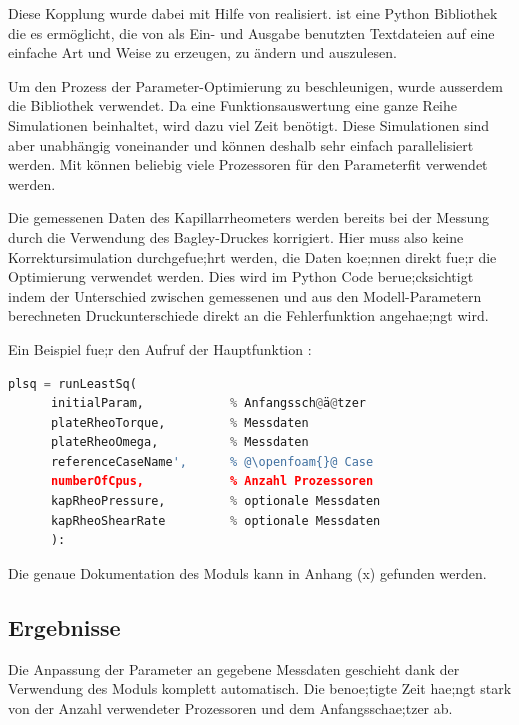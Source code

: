 Diese Kopplung wurde dabei mit Hilfe von   realisiert.  ist eine Python Bibliothek die es ermöglicht, die von \openfoam{} als Ein- und Ausgabe benutzten Textdateien auf eine einfache Art und Weise zu erzeugen, zu ändern und auszulesen.

Um den Prozess der Parameter-Optimierung zu beschleunigen, wurde ausserdem die Bibliothek   verwendet. Da eine Funktionsauswertung eine ganze Reihe Simulationen beinhaltet, wird dazu viel Zeit benötigt. Diese Simulationen sind aber unabhängig voneinander und können deshalb sehr einfach parallelisiert werden. Mit  können beliebig viele Prozessoren für den Parameterfit verwendet werden.

Die gemessenen Daten des Kapillarrheometers werden bereits bei der Messung durch die Verwendung des Bagley-Druckes korrigiert. Hier muss also keine Korrektursimulation durchgefue;hrt werden, die Daten koe;nnen direkt fue;r die Optimierung verwendet werden. Dies wird im Python Code berue;cksichtigt indem der Unterschied zwischen gemessenen und aus den Modell-Parametern berechneten Druckunterschiede direkt an die Fehlerfunktion angehae;ngt wird.

Ein Beispiel fue;r den Aufruf der Hauptfunktion :
\begin{lstlisting}[language=Python]
plsq = runLeastSq(
      initialParam,            % Anfangssch@ä@tzer
      plateRheoTorque,         % Messdaten
      plateRheoOmega,          % Messdaten
      referenceCaseName',      % @\openfoam{}@ Case
      numberOfCpus,            % Anzahl Prozessoren
      kapRheoPressure,         % optionale Messdaten
      kapRheoShearRate         % optionale Messdaten
      ):  
\end{lstlisting}
%
Die genaue Dokumentation des Moduls kann in Anhang (x)  gefunden werden.
%
\subsection{Ergebnisse}
Die Anpassung der Parameter an gegebene Messdaten geschieht dank der Verwendung des  Moduls komplett automatisch. 
Die benoe;tigte Zeit hae;ngt stark von der Anzahl verwendeter Prozessoren und dem Anfangsschae;tzer ab.
%

